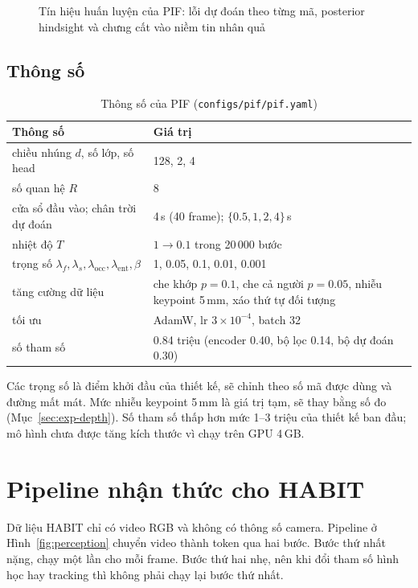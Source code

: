 \begin{figure}[H]
  \centering
  \fitfig{}
  \caption{Tín hiệu huấn luyện của PIF: lỗi dự đoán theo từng mã, posterior hindsight và chưng cất vào niềm tin nhân quả}
  \label{fig:pif-training}
\end{figure}

\subsection{Thông số}

\begin{table}[H]
  \centering
  \caption{Thông số của PIF (\texttt{configs/pif/pif.yaml})}
  \label{tab:pif-params}
  \small
  \begin{tabularx}{\textwidth}{@{}lX@{}}
    \toprule
    Thông số & Giá trị \\
    \midrule
    chiều nhúng $d$, số lớp, số head & 128, 2, 4 \\
    số quan hệ $R$ & 8 \\
    cửa sổ đầu vào; chân trời dự đoán & 4\,s (40 frame); $\{0.5,1,2,4\}$\,s \\
    nhiệt độ $T$ & $1\to0.1$ trong 20\,000 bước \\
    trọng số $\lambda_f,\lambda_s,\lambda_{\text{occ}},\lambda_{\text{ent}},\beta$ & 1, 0.05, 0.1, 0.01, 0.001 \\
    tăng cường dữ liệu & che khớp $p=0.1$, che cả người $p=0.05$, nhiễu keypoint 5\,mm, xáo thứ tự đối tượng \\
    tối ưu & AdamW, lr $3\times10^{-4}$, batch 32 \\
    số tham số & 0.84 triệu (encoder 0.40, bộ lọc 0.14, bộ dự đoán 0.30) \\
    \bottomrule
  \end{tabularx}
\end{table}
Các trọng số là điểm khởi đầu của thiết kế, sẽ chỉnh theo số mã được dùng và đường mất mát. Mức nhiễu keypoint 5\,mm là giá trị tạm, sẽ thay bằng số đo (Mục~\ref{sec:exp-depth}). Số tham số thấp hơn mức 1--3 triệu của thiết kế ban đầu; mô hình chưa được tăng kích thước vì chạy trên GPU 4\,GB.

\section{Pipeline nhận thức cho HABIT}
\label{sec:method-perception}

Dữ liệu HABIT chỉ có video RGB và không có thông số camera. Pipeline ở Hình~\ref{fig:perception} chuyển video thành token qua hai bước. Bước thứ nhất nặng, chạy một lần cho mỗi frame. Bước thứ hai nhẹ, nên khi đổi tham số hình học hay tracking thì không phải chạy lại bước thứ nhất.

